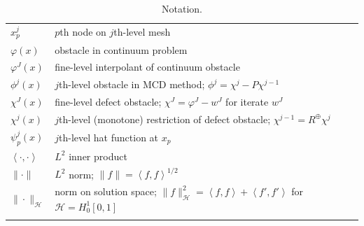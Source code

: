 \documentclass[letterpaper,final,12pt,reqno]{amsart}
\theoremstyle{claim}
\newcommand{\ip}[2]{\left<#1,#2\right>}
\newcommand{\mR}{R^{\bm{\oplus}}}
\numberwithin{equation}{section}
\numberwithin{figure}{section}
\numberwithin{table}{section}
\numberwithin{theorem}{section}
\begin{document}
\begin{longtable}{l|l}
$x_p^j$ & $p$th node on $j$th-level mesh \\
$\varphi(x)$ & obstacle in continuum problem \\
$\varphi^J(x)$ & fine-level interpolant of continuum obstacle \\
$\phi^j(x)$ & $j$th-level obstacle in MCD method; $\phi^j=\chi^j - P\chi^{j-1}$ \\
$\chi^J(x)$ & fine-level defect obstacle; $\chi^J = \varphi^J - w^J$ for iterate $w^J$ \\
$\chi^j(x)$ & $j$th-level (monotone) restriction of defect obstacle; $\chi^{j-1} = \mR \chi^j$ \\
$\psi_p^j(x)$ & $j$th-level hat function at $x_p$ \\
$\ip{\cdot}{\cdot}$ & $L^2$ inner product \\
$\|\cdot\|$ & $L^2$ norm; $\|f\|=\ip{f}{f}^{1/2}$ \\
$\|\cdot\|_{\mathcal{H}}$ & norm on solution space; $\|f\|_{\mathcal{H}}^2 =\ip{f}{f} + \ip{f'}{f'}$ for $\mathcal{H}=H_0^1[0,1]$ \\  %
\bottomrule
\caption{Notation.}
\label{tab:notation}
\end{longtable}
\end{document}

